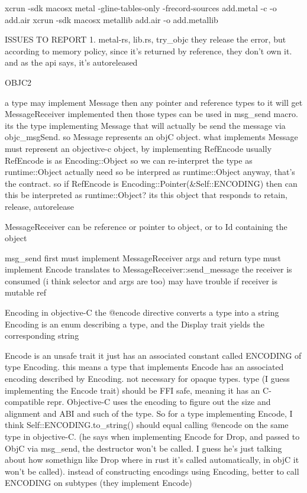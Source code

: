 
xcrun -sdk macosx metal -gline-tables-only -frecord-sources add.metal -c -o add.air
xcrun -sdk macosx metallib add.air -o add.metallib


ISSUES TO REPORT
1.
metal-rs, lib.rs, try_objc
they release the error, but according to memory policy, since it's returned by reference, they don't own it. and as the api says, it's autoreleased












OBJC2

a type may implement Message
then any pointer and reference types to it will get MessageReceiver implemented
then those types can be used in msg_send macro.
its the type implementing Message that will actually be send the message via objc_msgSend.
so Message represents an objC object.
what implements Message must represent an objective-c object, by implementing RefEncode
usually RefEncode is as Encoding::Object so we can re-interpret the type as runtime::Object
actually need so be interpred as runtime::Object anyway, that's the contract. so if RefEncode is Encoding::Pointer(&Self::ENCODING) then can this be interpreted as runtime::Object?
its this object that responds to retain, release, autorelease

MessageReceiver can be reference or pointer to object, or to Id containing the object


msg_send
first must implement MessageReceiver
args and return type must implement Encode
translates to MessageReceiver::send_message
the receiver is consumed (i think selector and args are too)
may have trouble if receiver is mutable ref











Encoding
in objective-C the @encode directive converts a type into a string
Encoding is an enum describing a type, and the Display trait yields the corresponding string

Encode
is an unsafe trait
it just has an associated constant called ENCODING of type Encoding.
this means a type that implements Encode has an associated encoding described by Encoding.
not necessary for opaque types. 
type (I guess implementing the Encode trait) should be FFI safe, meaning it has an C-compatible repr. 
Objective-C uses the encoding to figure out the size and alignment and ABI and such of the type.
So for a type implementing Encode, I think Self::ENCODING.to_string() should equal calling @encode on the same type in objective-C. 
(he says when implementing Encode for Drop, and passed to ObjC via msg_send, the destructor won't be called. I guess he's just talking about how somethign like Drop where in rust it's called automatically, in objC it won't be called).
instead of constructing encodings using Encoding, better to call ENCODING on subtypes (they implement Encode)

